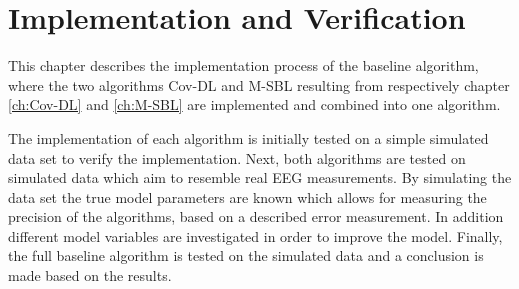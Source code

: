 \chapter{Implementation and Verification}\label{ch:implementation}
This chapter describes the implementation process of the baseline algorithm, where the two algorithms Cov-DL and M-SBL resulting from respectively chapter \ref{ch:Cov-DL} and \ref{ch:M-SBL} are implemented and combined into one algorithm.

The implementation of each algorithm is initially tested on a simple simulated data set to verify the implementation. Next, both algorithms are tested on simulated data which aim to resemble real EEG measurements. By simulating the data set the true model parameters are known which allows for measuring the precision of the algorithms, based on a described error measurement.     
In addition different model variables are investigated in order to improve the model.
Finally, the full baseline algorithm is tested on the simulated data and a conclusion is made based on the results. 







   






